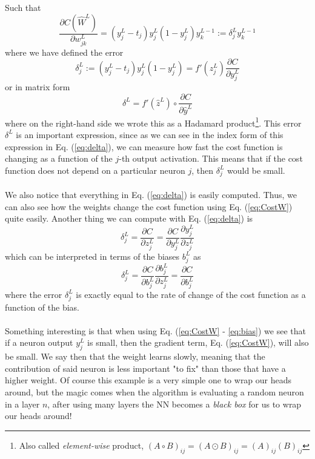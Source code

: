\documentclass[12pt, a4paper]{book}
\begin{document}
Such that
\begin{equation}\label{eq:CostW}
    \frac{\partial C(\hat W ^L) }{\partial w_{jk}^L}=\left(y_j^L-t_j\right)y_j^L(1-y_j^L)y_k^{L-1} :=\delta_j^Ly_k^{L-1}
\end{equation}
where we have defined the error
\begin{equation}\label{eq:delta}
    \delta_j^L:=\left(y_j^L-t_j\right)y_j^L(1-y_j^L)=f'(z_j^L)\frac{\partial C}{\partial y_j^L} 
\end{equation}
or in matrix form
$$
\delta^L = f'(\hat z ^L)\circ \frac{\partial C}{\partial \hat y ^L}
$$
where on the right-hand side we wrote this as a Hadamard product\footnote{Also called \textit{element-wise} product, $(A\circ B)_{ij} = (A\odot B)_{ij} = (A)_{ij}(B)_{ij}$}. This error $\delta^L$ is an important expression, since as we can see in the index form of this expression in Eq. (\ref{eq:delta}), we can measure how fast 
the cost function is changing as a function of the $j$-th output activation. This means that if the cost function does not depend on a particular neuron $j$, then $\delta_j^L$ would be small.  \\
\\We also notice that everything in Eq. (\ref{eq:delta}) is easily computed. Thus, we can also see how the weights change the cost function using Eq. (\ref{eq:CostW}) quite easily. 
Another thing we can compute with Eq. (\ref{eq:delta}) is
$$
\delta_j^L=\frac{\partial C}{\partial z_j^L} =\frac{\partial C}{\partial y_j^L}\frac{\partial y_j^L}{\partial z_j^L}
$$
which can be interpreted in terms of the biases $b_j^L$ as
\begin{equation}\label{eq:bias}
    \delta_j^L=\frac{\partial C}{\partial b_j^L}\frac{\partial b_j^L}{\partial z_j^L} = \frac{\partial C}{\partial b_j^L} 
\end{equation}
where the error $\delta_j^L$ is exactly equal to the rate of change of the cost function as a function of the bias.\\
\\Something interesting is that when using Eq. (\ref{eq:CostW} - \ref{eq:bias}) we see that if a neuron output $y_j^L$ is small, then the gradient term, Eq. (\ref{eq:CostW}), will also be small. We say then that the weight learns 
slowly, meaning that the contribution of said neuron is less important "to fix" than those that have a higher weight. Of course this example is a very simple one to wrap our heads around, but the magic comes when the algorithm is 
evaluating a random neuron in a layer $n$, after using many layers the NN becomes a \textit{black box} for us to wrap our heads around!\\
\end{document}
